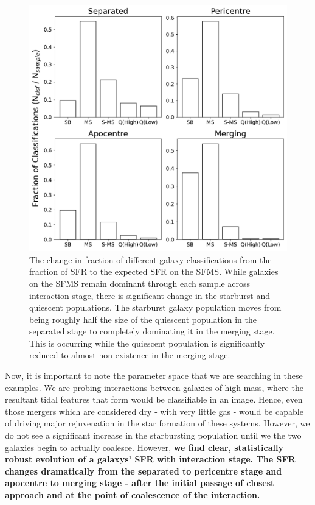 \begin{figure}
    \centering
    \includegraphics[width=\textwidth]{Chapter3/figures/sfr-clsf-bar.pdf}
    \caption[The change in fraction of different galaxy classifications from the fraction of SFR to the expected SFR on the SFMS.]{The change in fraction of different galaxy classifications from the fraction of SFR to the expected SFR on the SFMS. While galaxies on the SFMS remain dominant through each sample across interaction stage, there is significant change in the starburst and quiescent populations. The starburst galaxy population moves from being roughly half the size of the quiescent population in the separated stage to completely dominating it in the merging stage. This is occurring while the quiescent population is significantly reduced to almost non-existence in the merging stage.}
    \label{fig:sfr-clsf-bar}
\end{figure}

Now, it is important to note the parameter space that we are searching in these examples. We are probing interactions between galaxies of high mass, where the resultant tidal features that form would be classifiable in an image. Hence, even those mergers which are considered dry - with very little gas - would be capable of driving major rejuvenation in the star formation of these systems. However, we do not see a significant increase in the starbursting population until we the two galaxies begin to actually coalesce. However, \textbf{we find clear, statistically robust evolution of a galaxys' SFR with interaction stage. The SFR changes dramatically from the separated to pericentre stage and apocentre to merging stage - after the initial passage of closest approach and at the point of coalescence of the interaction.}

